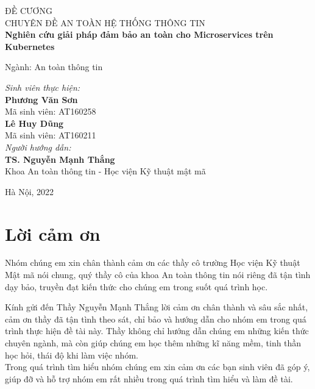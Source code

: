 \documentclass[12pt,a4paper]{report}
\begin{document}
\begin{titlepage}
	\begin{center}
		{\Huge ĐỀ CƯƠNG\\}
		{\large CHUYÊN ĐỀ AN TOÀN HỆ THỐNG THÔNG TIN\\}
		\textbf{Nghiên cứu giải pháp đảm bảo an toàn cho Microservices trên Kubernetes}
	\end{center}
	\bigskip
	\begin{flushright}
		\large{Ngành: An toàn thông tin}
	\end{flushright}
	\vspace{30mm}
	\begin{flushleft}
		\textit{Sinh viên thực hiện:}\\
		\textbf{Phương Văn Sơn}\\
		Mã sinh viên: AT160258\\
		\textbf{Lê Huy Dũng}\\
		Mã sinh viên: AT160211
		\bigskip\\
		\textit{Người hướng dẫn:}\\
		\textbf{TS. Nguyễn Mạnh Thắng}\\
		Khoa An toàn thông tin - Học viện Kỹ thuật mật mã
	\end{flushleft}
	\vfill
	\begin{center}
		Hà Nội, 2022
	\end{center}
	
\end{titlepage}

	\tableofcontents
	
	\chapter*{\centering Lời cảm ơn}
	\hspace{0.6cm}Nhóm chúng em xin chân thành cảm ơn các thầy cô trường Học viện Kỹ thuật Mật mã nói chung, quý thầy cô của khoa An toàn thông tin nói riêng đã tận tình dạy bảo, truyền đạt kiến thức cho chúng em trong suốt quá trình học.\newline
	
	Kính gửi đến Thầy Nguyễn Mạnh Thắng lời cảm ơn chân thành và sâu sắc nhất, cảm ơn thầy đã tận tình theo sát, chỉ bảo và hướng dẫn cho nhóm em trong quá trình thực hiện đề tài này. Thầy không chỉ hướng dẫn chúng em những kiến thức chuyên ngành, mà còn giúp chúng em học thêm những kĩ năng mềm, tinh thần học hỏi, thái độ khi làm việc nhóm.\\
	
	Trong quá trình tìm hiểu nhóm chúng em xin cảm ơn các bạn sinh viên đã góp ý, giúp đỡ và hỗ trợ nhóm em rất nhiều trong quá trình tìm hiểu và làm đề tài.\\
	
\end{document}
